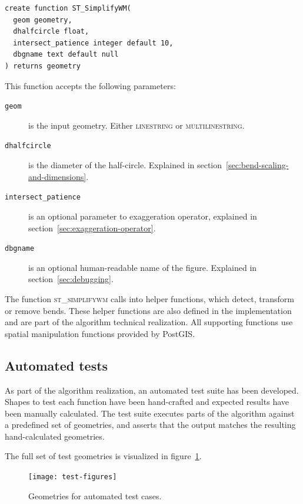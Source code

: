 \documentclass[a4paper]{article}
\begin{document}
\begin{verbatim}
create function ST_SimplifyWM(
  geom geometry,
  dhalfcircle float,
  intersect_patience integer default 10,
  dbgname text default null
) returns geometry
\end{verbatim}

This function accepts the following parameters:
\begin{description}

    \item[\normalfont\texttt{geom}] is the input geometry. Either
        \textsc{linestring} or \textsc{multilinestring}.

    \item[\normalfont\texttt{dhalfcircle}] is the diameter of the half-circle.
        Explained in section~\ref{sec:bend-scaling-and-dimensions}.

    \item[\normalfont\texttt{intersect\_patience}] is an optional parameter to
        exaggeration operator, explained in
        section~\ref{sec:exaggeration-operator}.

    \item[\normalfont\texttt{dbgname}] is an optional human-readable name of
        the figure. Explained in section~\ref{sec:debugging}.

\end{description}

The function \textsc{st\_simplifywm} calls into helper functions, which detect,
transform or remove bends. These helper functions are also defined in the
implementation and are part of the algorithm technical realization. All
supporting functions use spatial manipulation functions provided by PostGIS.

\subsection{Automated tests}
\label{sec:automated-tests}

As part of the algorithm realization, an automated test suite has been
developed. Shapes to test each function have been hand-crafted and expected
results have been manually calculated. The test suite executes parts of the
algorithm against a predefined set of geometries, and asserts that the output
matches the resulting hand-calculated geometries.

The full set of test geometries is visualized in figure~\ref{fig:test-figures}.

\begin{figure}[ht]
    \centering
    \texttt{[image: test-figures]}
    \caption{Geometries for automated test cases.}
    \label{fig:test-figures}
\end{figure}
\end{document}
